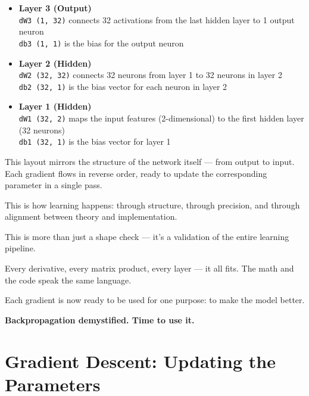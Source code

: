 \documentclass[11pt]{article}
\begin{document}
\begin{itemize}
  \item \textbf{Layer 3 (Output)} \\
  \texttt{dW3 (1, 32)} connects 32 activations from the last hidden layer to 1 output neuron \\
  \texttt{db3 (1, 1)} is the bias for the output neuron
  \medskip
  \item \textbf{Layer 2 (Hidden)} \\
  \texttt{dW2 (32, 32)} connects 32 neurons from layer 1 to 32 neurons in layer 2 \\
  \texttt{db2 (32, 1)} is the bias vector for each neuron in layer 2
  \medskip
  \item \textbf{Layer 1 (Hidden)} \\
  \texttt{dW1 (32, 2)} maps the input features (2-dimensional) to the first hidden layer (32 neurons) \\
  \texttt{db1 (32, 1)} is the bias vector for layer 1
\end{itemize}

\bigskip

This layout mirrors the structure of the network itself — from output to input.  
Each gradient flows in reverse order, ready to update the corresponding parameter in a single pass.

\medskip

\noindent
This is how learning happens: through structure, through precision, and through alignment between theory and implementation.

\medskip

\noindent
This is more than just a shape check — it’s a validation of the entire learning pipeline.

Every derivative, every matrix product, every layer — it all fits.  
The math and the code speak the same language.

\bigskip

Each gradient is now ready to be used for one purpose: to make the model better.


\newpage
\begin{center}
\LARGE \textbf{Backpropagation demystified. Time to use it.}
\end{center}


\section*{Gradient Descent: Updating the Parameters}
\end{document}
